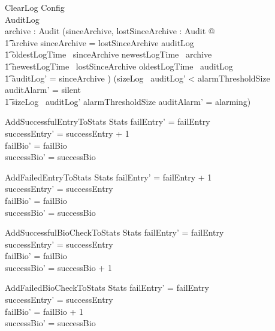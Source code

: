 \begin{schema}{ClearLog}
        Config
\\      \Delta AuditLog
\\      archive : \finset Audit
\where
      (\exists sinceArchive,
        lostSinceArchive : \finset Audit @  
\\ \t1    archive \cup sinceArchive = lostSinceArchive \cup auditLog 
\\ \t1    \land oldestLogTime~ sinceArchive \geq newestLogTime~ archive
\\ \t1    \land newestLogTime~ lostSinceArchive \leq oldestLogTime~ auditLog
\\ \t1    \land auditLog' = sinceArchive )
\also
        (sizeLog~ auditLog' < alarmThresholdSize \land auditAlarm' = silent
\\ \t1  \lor sizeLog~ auditLog' \geq alarmThresholdSize \land auditAlarm' = alarming)

\end{schema}

\begin{schema}{AddSuccessfulEntryToStats}
        \Delta Stats
\where
        failEntry' = failEntry 
\\      successEntry' = successEntry + 1
\\      failBio' = failBio
\\      successBio' = successBio 
\end{schema}

\begin{schema}{AddFailedEntryToStats}
        \Delta Stats
\where
        failEntry' = failEntry + 1
\\      successEntry' = successEntry
\\      failBio' = failBio
\\      successBio' = successBio 
\end{schema}

\begin{schema}{AddSuccessfulBioCheckToStats}
        \Delta Stats
\where
        failEntry' = failEntry 
\\      successEntry' = successEntry
\\      failBio' = failBio
\\      successBio' = successBio + 1
\end{schema}

\begin{schema}{AddFailedBioCheckToStats}
        \Delta Stats
\where
        failEntry' = failEntry 
\\      successEntry' = successEntry
\\      failBio' = failBio + 1
\\      successBio' = successBio
\end{schema}

